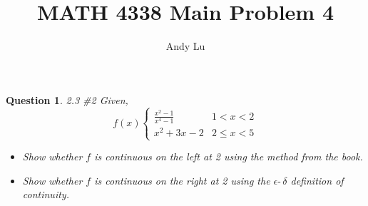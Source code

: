 \documentclass{article}
\title{MATH 4338 Main Problem 4}
\date{}
\author{Andy Lu}
\newtheorem{theorem*}{Question}
\begin{document}
  \maketitle
  \begin{theorem*} 2.3 \#2
    \newline
    Given, 
    $$f(x)
    \begin{cases} 
          \frac{x^2-1}{x^4-1} & 1 < x < 2 \\
          x^2 +3x - 2 & 2 \leq x < 5
       \end{cases}
    $$
    \begin{itemize}
      \item Show whether $f$ is continuous on the left at 2 using the method from the book.
      \item Show whether $f$ is continuous on the right at 2 using the $\epsilon\text{-}\,\delta$ definition of continuity.
    \end{itemize}
  \end{theorem*}
  
\end{document}

